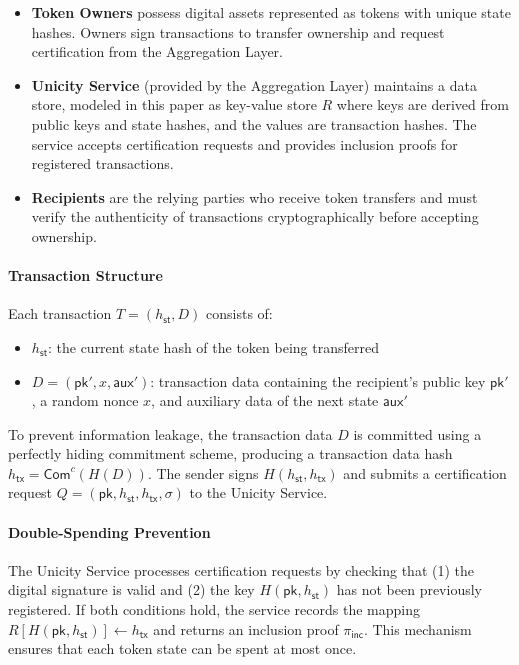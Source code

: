 \documentclass{article}
\newcommand{\pubkey}[0]{\mathsf{pk}}
\newcommand{\commitc}[0]{{\mathsf{Com}^{c}}}
\newcommand{\sthash}[0]{{h_\mathsf{st}}}
\newcommand{\txhash}[0]{{h_\mathsf{tx}}}
\newcommand{\auxd}[0]{\mathsf{aux}}
\newcommand{\pinc}[0]{{\pi_{\mathsf{inc}}}}
\begin{document}
\begin{itemize}
\item \textbf{Token Owners} possess digital assets represented as tokens with unique state hashes. Owners sign transactions to transfer ownership and request certification from the Aggregation Layer.

\item \textbf{Unicity Service} (provided by the Aggregation Layer) maintains a data store, modeled in this paper as key-value store $R$ where keys are derived from public keys and state hashes, and the values are transaction hashes. The service accepts certification requests and provides inclusion proofs for registered transactions.

\item \textbf{Recipients} are the relying parties who receive token transfers and must verify the authenticity of transactions cryptographically before accepting ownership.
\end{itemize}

\paragraph{Transaction Structure}
Each transaction $T = (\sthash, D)$ consists of:
\begin{itemize}
\item $\sthash$: the current state hash of the token being transferred
\item $D = (\pubkey', x, \auxd')$: transaction data containing the recipient's public key $\pubkey'$, a random nonce $x$, and auxiliary data of the next state $\auxd'$
\end{itemize}

\noindent To prevent information leakage, the transaction data $D$ is committed using a perfectly hiding commitment scheme, producing a transaction data hash $\txhash = \commitc(H(D))$. The sender signs $H(\sthash, \txhash)$ and submits a certification request $Q = (\pubkey, \sthash, \txhash, \sigma)$ to the Unicity Service.

\paragraph{Double-Spending Prevention}
The Unicity Service processes certification requests by checking that (1) the digital signature is valid and (2) the key $H(\pubkey, \sthash)$ has not been previously registered. If both conditions hold, the service records the mapping $R[H(\pubkey, \sthash)] \gets \txhash$ and returns an inclusion proof $\pinc$. This mechanism ensures that each token state can be spent at most once.
\end{document}
